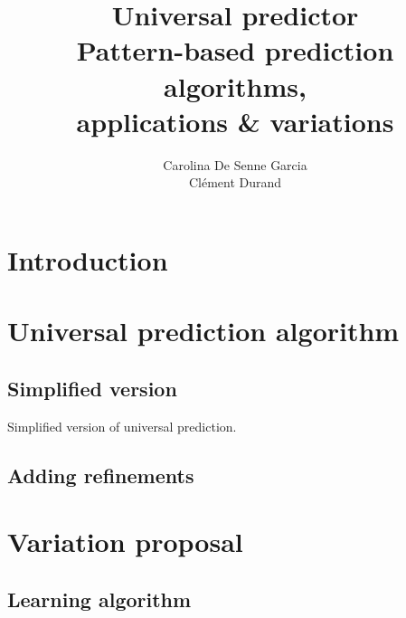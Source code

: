 \documentclass[a4paper,12pt]{article}
\title{%
  Universal predictor\\\small%
  Pattern-based prediction algorithms,\\%
  applications \& variations%
}
\author{%
  Carolina De Senne Garcia\\%
  Clément Durand%
}
\begin{document}
\maketitle

\vspace*{\fill}

\begin{abstract}
  \lipsum[1-2]
\end{abstract}

\vspace*{\fill}

\clearpage

\tableofcontents

\clearpage

\section*{Introduction}

\section{Universal prediction algorithm}

  \subsection{Simplified version}

  \begin{algorithm}

    \caption{\label{simplified}Simplified version of universal prediction.}
  \end{algorithm}

  \subsection{Adding refinements}

\section{Variation proposal}


  \subsection{Learning algorithm}
\end{document}
